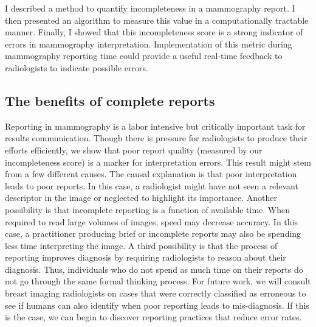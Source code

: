 I described a method to quantify incompleteness in a mammography report. I then presented an algorithm to measure this value in a computationally tractable manner. Finally, I showed that this incompleteness score is a strong indicator of errors in mammography interpretation. Implementation of this metric during mammography reporting time could provide a useful real-time feedback to radiologists to indicate possible errors.

\subsection{The benefits of complete reports}
Reporting in mammography is a labor intensive but critically important task for results communication. Though there is pressure for radiologists to produce their efforts efficiently, we show that poor report quality (measured by our incompleteness score) is a marker for interpretation errors. This result might stem from a few different causes. The causal explanation is that poor interpretation leads to poor reports. In this case, a radiologist might have not seen a relevant descriptor in the image or neglected to highlight its importance. Another possibility is that incomplete reporting is a function of available time. When required to read large volumes of images, speed may decrease accuracy. In this case, a practitioner producing brief or incomplete reports may also be spending less time interpreting the image. A third possibility is that the process of reporting improves diagnosis by requiring radiologists to reason about their diagnosis. Thus, individuals who do not spend as much time on their reports do not go through the same formal thinking process. For future work, we will consult breast imaging radiologists on cases that were correctly classified as erroneous to see if humans can also identify when poor reporting leads to mis-diagnosis. If this is the case, we can begin to discover reporting practices that reduce error rates.

